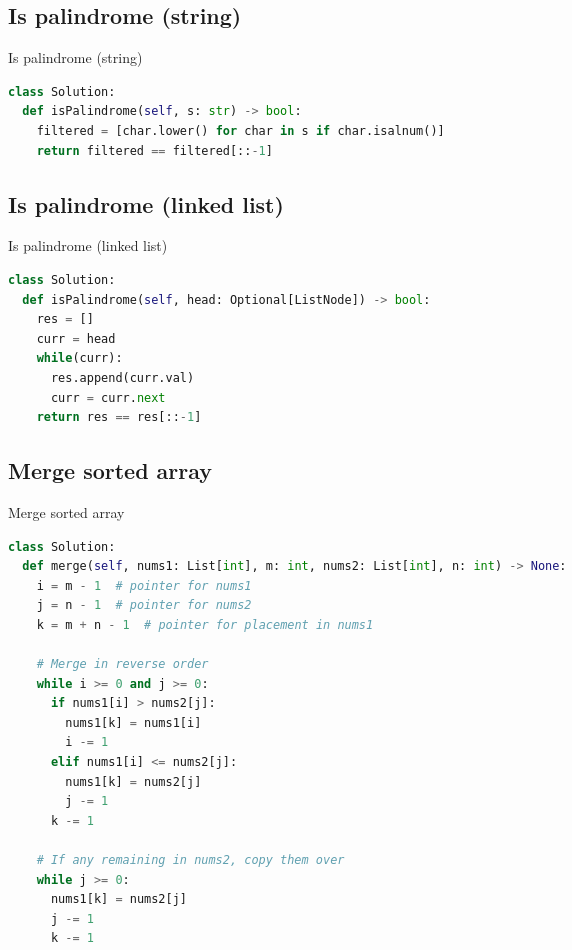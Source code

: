 \documentclass[a4paper,12pt]{article}
\begin{document}
\begin{multicols}{2}
\subsection{Is palindrome (string)}
\begin{mycode}[label={lst:is-palindrome-string}]{Is palindrome (string)}
\begin{lstlisting}[language=Python]
class Solution:
  def isPalindrome(self, s: str) -> bool:
    filtered = [char.lower() for char in s if char.isalnum()]
    return filtered == filtered[::-1]
\end{lstlisting}
\end{mycode}

\subsection{Is palindrome (linked list)}

\begin{mycode}[label={lst:is-palindrome-linked-list}]{Is palindrome (linked list)}
\begin{lstlisting}[language=Python]
class Solution:
  def isPalindrome(self, head: Optional[ListNode]) -> bool:
    res = []
    curr = head
    while(curr):
      res.append(curr.val)
      curr = curr.next
    return res == res[::-1]
\end{lstlisting}
\end{mycode}

\subsection{Merge sorted array}

\begin{mycode}[label={lst:merge-sorted-array}]{Merge sorted array}
\begin{lstlisting}[language=Python]
class Solution:
  def merge(self, nums1: List[int], m: int, nums2: List[int], n: int) -> None:
    i = m - 1  # pointer for nums1
    j = n - 1  # pointer for nums2
    k = m + n - 1  # pointer for placement in nums1

    # Merge in reverse order
    while i >= 0 and j >= 0:
      if nums1[i] > nums2[j]:
        nums1[k] = nums1[i]
        i -= 1
      elif nums1[i] <= nums2[j]:
        nums1[k] = nums2[j]
        j -= 1
      k -= 1

    # If any remaining in nums2, copy them over
    while j >= 0:
      nums1[k] = nums2[j]
      j -= 1
      k -= 1
\end{lstlisting}
\end{mycode}


\end{multicols}
\end{document}
